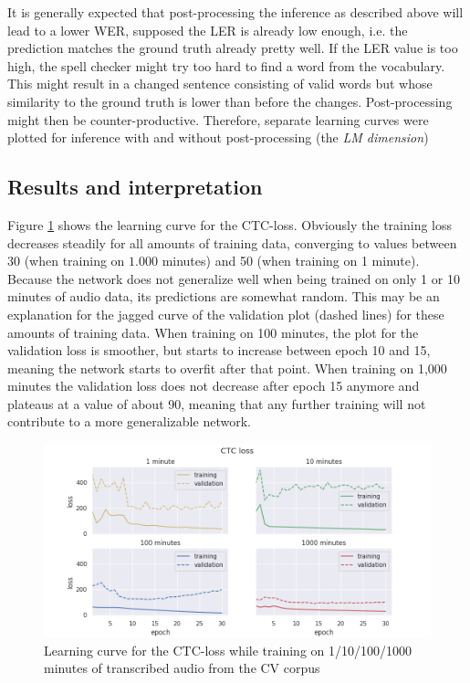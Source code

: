 It is generally expected that post-processing the inference as described above will lead to a lower \ac{WER}, supposed the \ac{LER} is already low enough, i.e. the prediction matches the ground truth already pretty well. If the \ac{LER} value is too high, the spell checker might try too hard to find a word from the vocabulary. This might result in a changed sentence consisting of valid words but whose similarity to the ground truth is lower than before the changes. Post-processing might then be counter-productive. Therefore, separate learning curves were plotted for inference with and without post-processing (the \textit{\ac{LM} dimension})

\subsection{Results and interpretation}

Figure \ref{lc_loss_cv} shows the learning curve for the \ac{CTC}-loss. Obviously the training loss decreases steadily for all amounts of training data, converging to values between 30 (when training on $1.000$ minutes) and 50 (when training on 1 minute). Because the network does not generalize well when being trained on only 1 or 10 minutes of audio data, its predictions are somewhat random. This may be an explanation for the jagged curve of the validation plot (dashed lines) for these amounts of training data. When training on 100 minutes, the plot for the validation loss is smoother, but starts to increase between epoch 10 and 15, meaning the network starts to overfit after that point. When training on 1,000 minutes the validation loss does not decrease after epoch 15 anymore and plateaus at a value of about 90, meaning that any further training will not contribute to a more generalizable network.

\begin{figure}[h!]
	\includegraphics[width=\linewidth]{./img/lc_loss_cv.png}
	\caption{Learning curve for the CTC-loss while training on 1/10/100/1000 minutes of transcribed audio from the \ac{CV} corpus}
	\label{lc_loss_cv}
\end{figure}

